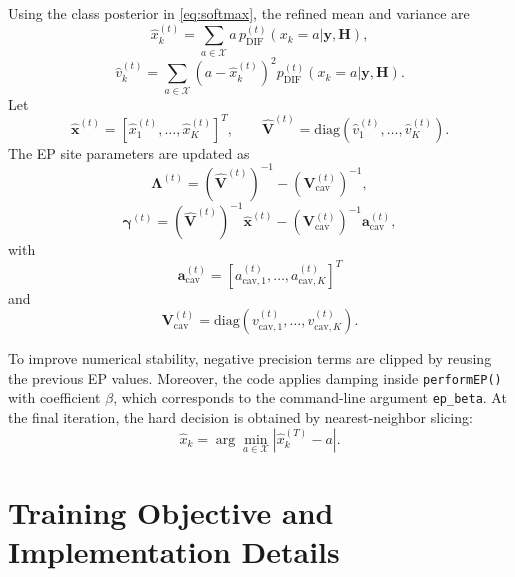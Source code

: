 \documentclass[conference]{IEEEtran}
\begin{document}
Using the class posterior in \eqref{eq:softmax}, the refined mean and variance are
\begin{equation}
\hat{x}_k^{(t)}
=
\sum_{a\in\mathcal{X}}
a\,p_{\mathrm{DIF}}^{(t)}(x_k=a|\mathbf{y},\mathbf{H}),
\label{eq:xhat}
\end{equation}
\begin{equation}
\hat{v}_k^{(t)}
=
\sum_{a\in\mathcal{X}}
\left(a-\hat{x}_k^{(t)}\right)^2
p_{\mathrm{DIF}}^{(t)}(x_k=a|\mathbf{y},\mathbf{H}).
\label{eq:vhat}
\end{equation}
Let
\begin{equation}
\hat{\mathbf{x}}^{(t)}
=
[\hat{x}_1^{(t)},\ldots,\hat{x}_K^{(t)}]^T,
\qquad
\hat{\mathbf{V}}^{(t)}
=
\mathrm{diag}(\hat{v}_1^{(t)},\ldots,\hat{v}_K^{(t)}).
\end{equation}
The EP site parameters are updated as
\begin{equation}
\bm{\Lambda}^{(t)}
=
(\hat{\mathbf{V}}^{(t)})^{-1}
-
(\mathbf{V}_{\mathrm{cav}}^{(t)})^{-1},
\label{eq:lambda_update}
\end{equation}
\begin{equation}
\bm{\gamma}^{(t)}
=
(\hat{\mathbf{V}}^{(t)})^{-1}\hat{\mathbf{x}}^{(t)}
-
(\mathbf{V}_{\mathrm{cav}}^{(t)})^{-1}\mathbf{a}_{\mathrm{cav}}^{(t)},
\label{eq:gamma_update}
\end{equation}
with
\begin{equation}
\mathbf{a}_{\mathrm{cav}}^{(t)}
=
[a_{\mathrm{cav},1}^{(t)},\ldots,a_{\mathrm{cav},K}^{(t)}]^T
\end{equation}
and
\begin{equation}
\mathbf{V}_{\mathrm{cav}}^{(t)}
=
\mathrm{diag}(v_{\mathrm{cav},1}^{(t)},\ldots,v_{\mathrm{cav},K}^{(t)}).
\end{equation}

To improve numerical stability, negative precision terms are clipped by reusing the previous EP values. Moreover, the code applies damping inside \texttt{performEP()} with coefficient $\beta$, which corresponds to the command-line argument \texttt{ep\_beta}. At the final iteration, the hard decision is obtained by nearest-neighbor slicing:
\begin{equation}
\hat{x}_k
=
\arg\min_{a\in\mathcal{X}}
|\hat{x}_k^{(T)}-a|.
\label{eq:hard_decision}
\end{equation}

\section{Training Objective and Implementation Details}
\end{document}
